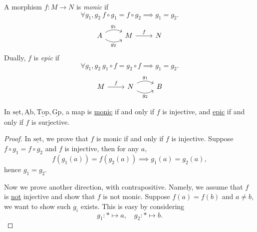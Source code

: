 \begin{definition}\label{def:monic,epic}
	A morphism \(f\colon M\to N\) is \emph{monic} if
	\[
		\forall g_1, g_2\ f\circ g_1 = f\circ g_2 \implies g_1 = g_2.
	\]
	\[
		\begin{tikzcd}
			A\ar[r, bend left, "g_1"]\ar[r, bend right, "g_2"']& M \ar[r, "f"]& N
		\end{tikzcd}
	\]
	Dually, \(f\) is \emph{epic} if
	\[
		\forall g_1, g_2\ g_{1} \circ f = g_2 \circ f \implies g_1 = g_2.
	\]
	\[
		\begin{tikzcd}
			M\ar[r, "f"]& N\ar[r, bend left, "g_1"]\ar[r, bend right, "g_2"']& B
		\end{tikzcd}
	\]
\end{definition}

\begin{lemma}
	In \(\underline{\mathrm{set}}, \underline{\mathrm{Ab}}, \underline{\mathrm{Top}}, \underline{\mathrm{Gp}}\), a map is \hyperref[def:monic,epic]{monic} if and only
	if \(f\) is injective, and \hyperref[def:monic,epic]{epic} if and only if \(f\) is surjective.
\end{lemma}
\begin{proof}
	In \(\underline{\mathrm{set}}\), we prove that \(f\) is monic if and only if \(f\) is injective. Suppose
	\(f\circ g_1 = f\circ g_2\) and \(f\) is injective, then for any \(a\),
	\[
		f(g_1(a)) = f(g_2(a))\implies g_1(a) = g_2(a),
	\]
	hence \(g_1 = g_2\).

	\par Now we prove another direction, with contrapositive. Namely, we assume that \(f\) is \underline{not} injective and show that
	\(f\) is not monic. Suppose \(f(a) = f(b)\) and \(a\neq b\), we want to show such \(g_{i}\) exists. This is easy by considering
	\[
		g_1\colon *\mapsto a,\quad g_2\colon *\mapsto b.
	\]
\end{proof}

